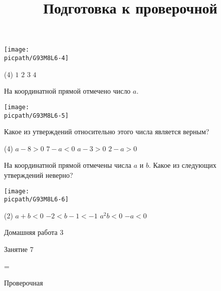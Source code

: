 \begin{class}[number=6]
\begin{listofex}
		\begin{center}
			\texttt{[image: \\picpath/G93M8L6-4]}
		\end{center}
		\begin{tasks}(4)
			\task \( 1 \)
			\task \( 2 \)
			\task \( 3 \)
			\task \( 4 \)
		\end{tasks}
		\item На координатной прямой отмечено число \( a \).
		\begin{center}
			\texttt{[image: \\picpath/G93M8L6-5]}
		\end{center}
		Какое из утверждений относительно этого числа является верным?
		\begin{tasks}(4)
			\task \( a-8>0 \)
			\task \( 7-a<0 \)
			\task \( a-3>0 \)
			\task \( 2-a>0 \)
		\end{tasks}
		\item На координатной прямой отмечены числа \( a \) и \( b \). Какое из следующих утверждений неверно?
		\begin{center}
			\texttt{[image: \\picpath/G93M8L6-6]}
		\end{center}
		\begin{tasks}(2)
			\task \( a+b<0 \)
			\task \( -2<b-1<-1 \)
			\task \( a^2b<0 \)
			\task \( -a<0 \)
		\end{tasks}
	\end{listofex}
\end{class}

\begin{homework}[number=3]
	\begin{listofex}
		\item Домашняя работа 3
	\end{listofex}
\end{homework}

\begin{class}[number=7]
	\title{Подготовка к проверочной}
	\begin{listofex}
		\item Занятие 7
	\end{listofex}
\end{class}

=%
\begin{exam}
	\begin{listofex}
		\item Проверочная
	\end{listofex}
\end{exam}
